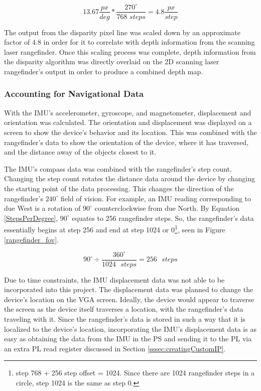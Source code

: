 \begin{equation} \label{yeeboi}
13.67\frac{px}{deg}*\frac{270^\circ}{768\,\,steps} = 4.8\frac{px}{step}
\end{equation}
\par
The output from the disparity pixel line was scaled down by an approximate factor of 4.8 in order for it to correlate with depth information from the scanning laser rangefinder. Once this scaling process was complete, depth information from the disparity algorithm was directly overlaid on the 2D scanning laser rangefinder's output in order to produce a combined depth map. 

\subsubsection{Accounting for Navigational Data}
With the IMU's accelerometer, gyroscope, and magnetometer, displacement and orientation was calculated. The orientation and displacement was displayed on a screen to show the device's behavior and its location. This was combined with the rangefinder's data to show the orientation of the device, where it has traversed, and the distance away of the objects closest to it.
\par
The IMU's compass data was combined with the rangefinder's step count. Changing the step count rotates the distance data around the device by changing the starting point of the data processing. This changes the direction of the rangefinder's $240^\circ$ field of vision. For example, an IMU reading corresponding to due West is a rotation of $90^\circ$ counterclockwise from due North. By Equation \ref{StepsPerDegree}, $90^\circ$ equates to 256 rangefinder steps. So, the rangefinder's data essentially begins at step 256 and end at step 1024 or 0\footnote{step 768 + 256 step offset = 1024. Since there are 1024 rangefinder steps in a circle, step 1024 is the same as step 0.}, seen in Figure \ref{rangefinder_fov}.

\begin{equation}
	90^\circ \div \dfrac{360^\circ}{1024 \textrm{ } steps}  = 256 \textrm{ } steps
	\label{StepsPerDegree}
\end{equation}

\par
Due to time constraints, the IMU displacement data was not able to be incorporated into this project. The displacement data was planned to change the device's location on the VGA screen. Ideally, the device would appear to traverse the screen as the device itself traverses a location, with the rangefinder's data traveling with it. Since the rangefinder's data is stored in such a way that it is localized to the device's location, incorporating the IMU's displacement data is as easy as obtaining the data from the IMU in the PS and sending it to the PL via an extra PL read register discussed in Section \ref{sssec:creatingCustomIP}.



